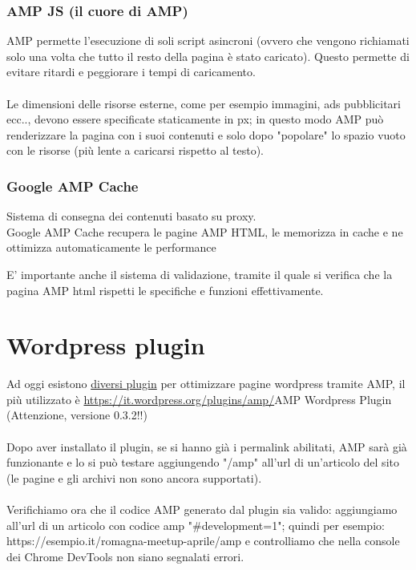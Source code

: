 \documentclass[a4paper]{article}
\begin{document}
    \subsubsection{AMP JS (il cuore di AMP)}
    AMP permette l'esecuzione di soli script asincroni (ovvero che vengono richiamati solo una volta che tutto il resto della pagina è stato caricato). Questo permette di evitare ritardi e peggiorare i tempi di caricamento.\\
    \\
    Le dimensioni delle risorse esterne, come per esempio immagini, ads pubblicitari ecc.., devono essere specificate staticamente in px; in questo modo AMP può renderizzare la pagina con i suoi contenuti e solo dopo "popolare" lo spazio vuoto con le risorse (più lente a caricarsi rispetto al testo).\\
    
    \subsubsection{Google AMP Cache}
    Sistema di consegna dei contenuti basato su proxy.\\
    Google AMP Cache recupera le pagine AMP HTML, le memorizza in cache e ne ottimizza automaticamente le performance
    
    E' importante anche il sistema di validazione, tramite il quale si verifica che la pagina AMP html rispetti le specifiche e funzioni effettivamente.
\newpage
\section{Wordpress plugin}
Ad oggi esistono \href{https://it.wordpress.org/plugins/search.php?q=amp}{diversi plugin} per ottimizzare pagine wordpress tramite AMP, il più utilizzato è \url{https://it.wordpress.org/plugins/amp/}{AMP Wordpress Plugin} (Attenzione, versione 0.3.2!!)\\
\\
Dopo aver installato il plugin, se si hanno già i permalink abilitati, AMP sarà già funzionante e lo si può testare aggiungendo "/amp" all'url di un'articolo del sito (le pagine e gli archivi non sono ancora supportati).\\
\\
Verifichiamo ora che il codice AMP generato dal plugin sia valido: aggiungiamo all'url di un articolo con codice amp "\#development=1"; quindi per esempio: https://esempio.it/romagna-meetup-aprile/amp e controlliamo che nella console dei Chrome DevTools non siano segnalati errori.
\end{document}
